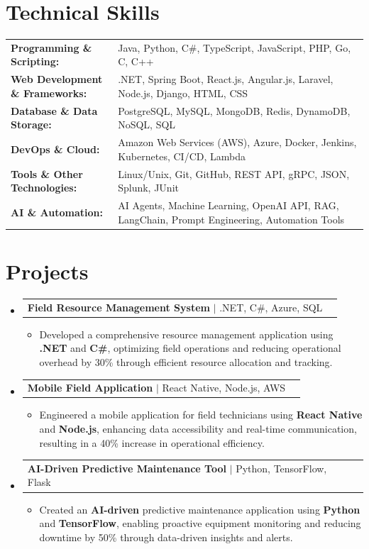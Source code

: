 \documentclass[letterpaper,10pt]{article}
\makeatletter
\newcommand{\resumeItem}[1]{
  \item{\fontsize{8pt}{9pt}\selectfont
    #1 \vspace{-3pt}
  }
}
\newcommand{\resumeProjectHeading}[2]{
    \item
    \begin{tabular*}{1.001\textwidth}{l@{\extracolsep{\fill}}r}
      \fontsize{8.5pt}{10pt}#1 & \textbf{\fontsize{8.5pt}{10pt} #2}\\
    \end{tabular*}\vspace{-7pt}
}
\newcommand{\resumeSubHeadingListStart}{\begin{itemize}[leftmargin=0pt, label={}]}
\newcommand{\resumeSubHeadingListEnd}{\end{itemize}}
\newcommand{\resumeItemListStart}{\begin{itemize}[leftmargin=*]}
\newcommand{\resumeItemListEnd}{\end{itemize}\vspace{-5pt}}
\makeatother
\begin{document}
\section{Technical Skills}
        \vspace{-14pt}
        \begin{table}[h]
            \fontsize{8pt}{9pt}\selectfont
            \begin{tabular}{p{0.3\linewidth} p{0.7\linewidth}}
                \textbf{Programming \& Scripting:} & Java, Python, C\#, TypeScript, JavaScript, PHP, Go, C, C++ \\
                \textbf{Web Development \& Frameworks:} & .NET, Spring Boot, React.js, Angular.js, Laravel, Node.js, Django, HTML, CSS \\
                \textbf{Database \& Data Storage:} & PostgreSQL, MySQL, MongoDB, Redis, DynamoDB, NoSQL, SQL \\
                \textbf{DevOps \& Cloud:} & Amazon Web Services (AWS), Azure, Docker, Jenkins, Kubernetes, CI/CD, Lambda \\
                \textbf{Tools \& Other Technologies:} & Linux/Unix, Git, GitHub, REST API, gRPC, JSON, Splunk, JUnit \\
                \textbf{AI \& Automation:} & AI Agents, Machine Learning, OpenAI API, RAG, LangChain, Prompt Engineering, Automation Tools \\
            \end{tabular}
        \end{table}
 \vspace{-18pt}

\section{Projects}
    \vspace{-5pt}
    \resumeSubHeadingListStart
          \resumeProjectHeading
            {\textbf{Field Resource Management System} $|$ .NET, C\#, Azure, SQL}{}
            \resumeItemListStart
                \resumeItem{Developed a comprehensive resource management application using \textbf{.NET} and \textbf{C\#}, optimizing field operations and reducing operational overhead by 30\% through efficient resource allocation and tracking.}
            \resumeItemListEnd
        \vspace{-12pt}
    
        \resumeProjectHeading
            {\textbf{Mobile Field Application} $|$ React Native, Node.js, AWS}{}
        \resumeItemListStart
                \resumeItem{Engineered a mobile application for field technicians using \textbf{React Native} and \textbf{Node.js}, enhancing data accessibility and real-time communication, resulting in a 40\% increase in operational efficiency.}
        \resumeItemListEnd
      \vspace{-12pt}
      \resumeProjectHeading
        {\textbf{AI-Driven Predictive Maintenance Tool} $|$ Python, TensorFlow, Flask}{}
    \resumeItemListStart
            \resumeItem{Created an \textbf{AI-driven} predictive maintenance application using \textbf{Python} and \textbf{TensorFlow}, enabling proactive equipment monitoring and reducing downtime by 50\% through data-driven insights and alerts.}
    \resumeItemListEnd
    \resumeSubHeadingListEnd
\end{document}
